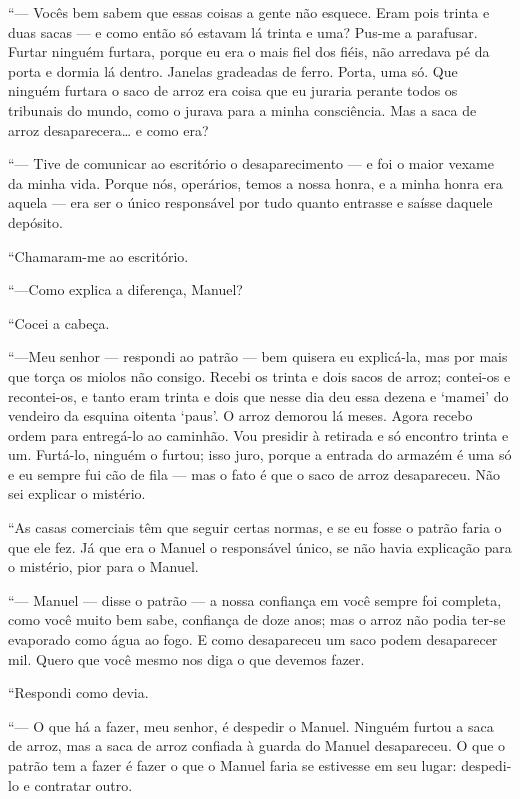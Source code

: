 ``--- Vocês bem sabem que essas coisas a gente não esquece. Eram pois
trinta e duas sacas --- e como então só estavam lá trinta e uma? Pus-me a
parafusar. Furtar ninguém furtara, porque eu era o mais fiel dos fiéis,
não arredava pé da porta e dormia lá dentro. Janelas gradeadas de ferro.
Porta, uma só. Que ninguém furtara o saco de arroz era coisa que eu
juraria perante todos os tribunais do mundo, como o jurava para a minha
consciência. Mas a saca de arroz desaparecera\ldots{} e como era?

``--- Tive de comunicar ao escritório o desaparecimento --- e foi o
maior vexame da minha vida. Porque nós, operários, temos a nossa honra,
e a minha honra era aquela --- era ser o único responsável por tudo
quanto entrasse e saísse daquele depósito.

``Chamaram-me ao escritório.

``---Como explica a diferença, Manuel?

``Cocei a cabeça.

``---Meu senhor --- respondi ao patrão --- bem quisera eu explicá-la, mas
por mais que torça os miolos não consigo. Recebi os trinta e dois sacos
de arroz; contei-os e recontei-os, e tanto eram trinta e dois que nesse
dia deu essa dezena e `mamei' do vendeiro da esquina oitenta `paus'. O
arroz demorou lá meses. Agora recebo ordem para entregá-lo ao caminhão.
Vou presidir à retirada e só encontro trinta e um. Furtá-lo, ninguém o
furtou; isso juro, porque a entrada do armazém é uma só e eu sempre fui
cão de fila --- mas o fato é que o saco de arroz desapareceu. Não sei
explicar o mistério.

``As casas comerciais têm que seguir certas normas, e se eu fosse o
patrão faria o que ele fez. Já que era o Manuel o responsável único, se
não havia explicação para o mistério, pior para o Manuel.

``--- Manuel --- disse o patrão --- a nossa confiança em você sempre foi
completa, como você muito bem sabe, confiança de doze anos; mas o arroz
não podia ter-se evaporado como água ao fogo. E como desapareceu um saco
podem desaparecer mil. Quero que você mesmo nos diga o que devemos
fazer.

``Respondi como devia.

``--- O que há a fazer, meu senhor, é despedir o Manuel. Ninguém furtou
a saca de arroz, mas a saca de arroz confiada à guarda do Manuel
desapareceu. O que o patrão tem a fazer é fazer o que o Manuel faria se
estivesse em seu lugar: despedi-lo e contratar outro.

